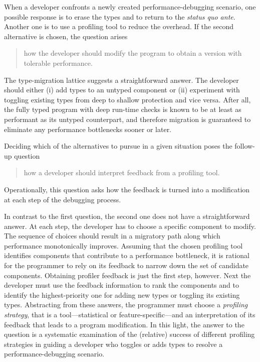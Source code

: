 
When a developer confronts a newly created performance-debugging scenario, one
possible response is to erase the types and to return to the {\em status quo
ante\/}.  Another one is to use a profiling tool to reduce the overhead. If the
second alternative is chosen, the question arises 
\begin{quote} \em

 how the developer should modify the program to obtain a version with tolerable
 performance.
 
\end{quote}   
The type-migration lattice suggests a straightforward answer.  The developer
should either (i) add types to an untyped component or (ii) experiment with
toggling existing types from deep to shallow protection and vice versa.  After
all, the fully typed program with deep run-time checks is known to be at least
as performant as its untyped counterpart, and therefore migration is guaranteed
to eliminate any performance bottlenecks sooner or later. 

Deciding which of the alternatives to pursue in a given situation poses the
follow-up question 
\begin{quote} \em

\item how a developer should interpret feedback from a profiling tool. 

\end{quote}   
Operationally, this question asks how the feedback is turned into a
modification at each step of the debugging process.

In contrast to the first question, the second one does not have a
straightforward answer.  At each step, the developer has to choose a
specific component to modify.  The sequence of choices should result in a
migratory path along which performance monotonically improves. Assuming
that the chosen profiling tool identifies components that contribute to
a performance bottleneck, it is rational for the programmer to rely on
its feedback to narrow down the set of candidate components.  Obtaining
profiler feedback is just the first step, however. Next the developer must
use the feedback information to rank the components and to identify the
highest-priority one for adding new types or toggling its existing types.
Abstracting from these answers, the programmer must choose a
\emph{profiling strategy}, that is a tool---statistical or
feature-specific---and an interpretation of its feedback that leads to a
program  modification. In this light, the answer to the question 
is a systematic examination of the
(relative) success of different profiling strategies in guiding a
developer who toggles or adds types to resolve a performance-debugging
scenario.

